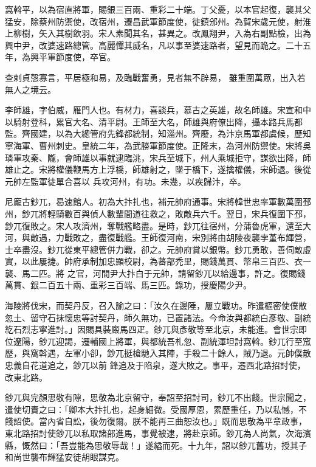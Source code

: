 \begin{pinyinscope}
 窩斡平，以為宿直將軍，賜銀三百兩、重彩二十端。丁父憂，以本官起復，襲其父猛安，除蔡州防禦使，改宿州，遷昌武軍節度使，徙鎮邠州。為賀宋歲元使，射淮上柳樹，矢入其樹飲羽。宋人素聞其名，甚異之。改鳳翔尹，入為右副點檢，出為興中尹，改婆速路總管。高麗憚其威名，凡以事至婆速路者，望見而跪之。二十五年，為興平軍節度使，卒官。



 查剌貞愨寡言，平居極和易，及臨戰奮勇，見者無不辟易，
 雖重圍萬眾，出入若無人之境云。



 李師雄，字伯威，雁門人也。有材力，喜談兵，慕古之英雄，故名師雄。宋宣和中以騎射登科，累官大名、清平尉。王師至大名，師雄與府僚出降，攝本路兵馬都監。齊國建，以為大總管府先鋒都統制，知淄州。齊廢，為汴京馬軍都虞候，歷知寧海軍、曹州刺史。皇統二年，為武勝軍節度使。正隆末，為河州防禦使。宋將吳璘軍攻秦、隴，會師雄以事就逮臨洮，宋兵至城下，州人乘城拒守，謀欲出降，師雄止之。宋將權儀鞭馬方上浮橋，師雄射之，墜于橋下，遂擒權儀，宋師退。後從元帥左監軍徒單合喜以
 兵攻河州，有功。未幾，以疾歸汴，卒。



 尼龐古鈔兀，曷速館人。初為大抃扎也，補元帥府通事。宋將韓世忠率軍數萬圍邳州，鈔兀將輕騎數百與偵人數輩間道往救之，敗敵兵六千。翌日，宋兵復圍下邳，鈔兀復敗之。宋人攻濟州，奪戰艦略盡。是時，鈔兀往宿州，分蒲魯虎軍，還至大河，與敵遇，力戰敗之，盡復戰艦。王師復河南，宋別將由胡陵夜襲孛堇布輝營，士卒盡沒。鈔兀從東平總管併力戰，卻之。元帥府賞以銀幣。鈔兀勇敢，善伺敵虛實，以此屢捷。帥府承制加忠顯校尉，為蕃部禿里，賜錢萬貫、幣帛三百匹、衣一襲、馬二匹。將
 之官，河間尹大抃白于元帥，請留鈔兀以給邊事，許之。復賜錢萬貫、銀二百五十兩、重彩三百端、馬三匹。錄功，授慶陽少尹。



 海陵將伐宋，而契丹反，召入諭之曰：「汝久在邊陲，屢立戰功。昨遣樞密使僕散忽土、留守石抹懷忠等討契丹，師久無功，已置諸法。今命汝與都統白彥敬、副統紇石烈志寧進討。」因賜具裝廄馬四疋。鈔兀與彥敬等至北京，未能進。會世宗即位遼陽，鈔兀迎謁，遷輔國上將軍，與都統吾札忽、副統渾坦討窩斡。鈔兀行至窊歷，與窩斡遇，左軍小卻，鈔兀挺槍馳入其陣，手殺二十餘人，賊乃退。元帥僕散忠義自花道追之，鈔兀以前
 鋒追及于陷泉，遂大敗之。事平，遷西北路招討使，改東北路。



 鈔兀與完顏思敬有隙，思敬為北京留守，奉詔至招討司，鈔兀不出餞。世宗聞之，遣使切責之曰：「卿本大抃扎也，起身細微。受國厚恩，累歷重任，乃以私憾，不餞詔使。當內省自訟，後勿復爾。朕不能再三曲恕汝也。」既而思敬為平章政事，東北路招討使鈔兀以私取諸部進馬，事覺被逮，將赴京師。鈔兀為人尚氣，次海濱縣，慨然曰：「吾豈能為思敬辱哉！」遂縊而死。十九年，詔以鈔兀舊功，授其子和尚世襲布輝猛安徒胡眼謀克。




\end{pinyinscope}
